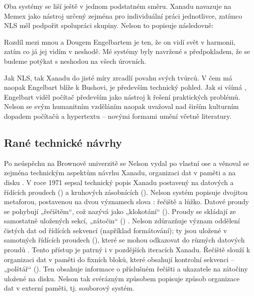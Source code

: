Oba systémy se liší ještě v jednom podstatném směru. Xanadu navazuje na Memex jako nástroj určený zejména pro individuální práci jednotlivce, zatímco NLS měl podpořit spolupráci skupiny. Nelson to popisuje následovně:

\begin{quoted}{\autocite[Rozhovor s Nelsonem podle][43]{Barnet2014}}
Rozdíl mezi mnou a Dougem Engelbartem je ten, že on vidí svět v harmonii, zatím co já jej vidím v neshodě. Mé systémy byly navržené s předpokladem, že se budeme potýkat s neshodou na všech úrovních.
\end{quoted}

Jak NLS, tak Xanadu do jisté míry zrcadlí povahu svých tvůrců.
V čem má naopak Engelbart blíže k Bushovi, je především technický pohled. Jak si všímá \textcite[14]{Rheingold1985}, Engelbart viděl počítač především jako nástroj k řešení praktických problémů. Nelson se svým humanitním vzděláním naopak uvažoval nad širším kulturním dopadem počítačů a hypertextu -- novými formami umění včetně literatury.

\subsection{Rané technické návrhy}

\label{p:evol:streams}
Po neúspěchu na Brownově univerzitě se Nelson vydal po vlastní ose a věnoval se zejména technickým aspektům návrhu Xanadu, organizaci dat v paměti a na disku \autocite[1/32]{LitMachines}. V roce 1971 sepsal technický popis Xanadu postavený na datových a řídících proudech () a kruhových zásobnících (). Nelson systém popisuje dvojitou metaforou, postavenou na dvou významech slova : řečiště a lůžko. Datové proudy se pohybují „řečištěm“, což nazývá jako „klokotání“ (). Proudy se skládají ze samostatně uložených sekcí, „zátočin“ () \autocite[8]{xtdd2}. Nelson zdůrazňuje význam oddělení čistých dat od řídících sekvencí (například formátování); ty jsou uložené v samotných řídících proudech (), které se mohou odkazovat do různých datových proudů \autocite[9]{xtdd2}. Tento přístup je patrný i v pozdějších iteracích Xanadu.
Řečiště slouží k organizaci dat v paměti do fixních bloků, které obsahují kontrolní sekvenci -- „polštář“ (). Ten obsahuje informace o příslušném řečišti a ukazatele na zátočiny uložené na disku. Nelson tak svérázným způsobem popisuje způsob organizace dat v externí paměti, tj. souborový systém.

